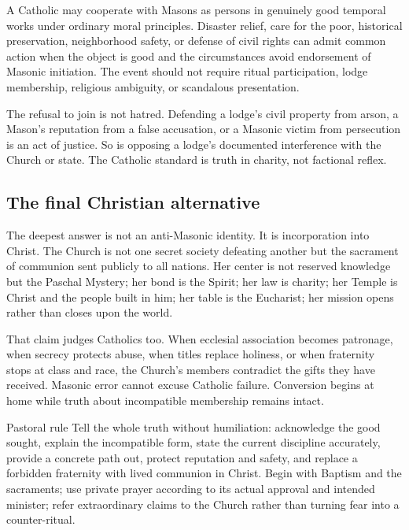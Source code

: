 A Catholic may cooperate with Masons as persons in genuinely good temporal works under ordinary moral principles. Disaster relief, care for the poor, historical preservation, neighborhood safety, or defense of civil rights can admit common action when the object is good and the circumstances avoid endorsement of Masonic initiation. The event should not require ritual participation, lodge membership, religious ambiguity, or scandalous presentation.

The refusal to join is not hatred. Defending a lodge's civil property from arson, a Mason's reputation from a false accusation, or a Masonic victim from persecution is an act of justice. So is opposing a lodge's documented interference with the Church or state. The Catholic standard is truth in charity, not factional reflex.

\subsection{The final Christian alternative}

The deepest answer is not an anti-Masonic identity. It is incorporation into Christ. The Church is not one secret society defeating another but the sacrament of communion sent publicly to all nations. Her center is not reserved knowledge but the Paschal Mystery; her bond is the Spirit; her law is charity; her Temple is Christ and the people built in him; her table is the Eucharist; her mission opens rather than closes upon the world.

That claim judges Catholics too. When ecclesial association becomes patronage, when secrecy protects abuse, when titles replace holiness, or when fraternity stops at class and race, the Church's members contradict the gifts they have received. Masonic error cannot excuse Catholic failure. Conversion begins at home while truth about incompatible membership remains intact.

\begin{massbox}{Pastoral rule}
Tell the whole truth without humiliation: acknowledge the good sought, explain the incompatible form, state the current discipline accurately, provide a concrete path out, protect reputation and safety, and replace a forbidden fraternity with lived communion in Christ. Begin with Baptism and the sacraments; use private prayer according to its actual approval and intended minister; refer extraordinary claims to the Church rather than turning fear into a counter-ritual.
\end{massbox}
